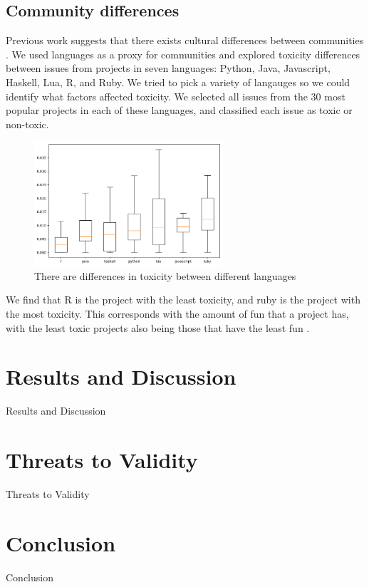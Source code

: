 \documentclass[conference]{IEEEtran}
\begin{document}
\subsection{Community differences} 
Previous work suggests that there exists cultural differences between communities \cite{bogart2016break}. We used languages as a proxy for communities and explored toxicity differences between issues from projects in seven languages: Python, Java, Javascript, Haskell, Lua, R, and Ruby. We tried to pick a variety of langauges so we could identify what factors affected toxicity. We selected all issues from the 30 most popular projects in each of these languages, and classified each issue as toxic or non-toxic. 

\begin{figure}
	\includegraphics[width=7cm]{box_plot.png}
	\caption{There are differences in toxicity between different languages} 
\end{figure}

We find that R is the project with the least toxicity, and ruby is the project with the most toxicity. This corresponds with the amount of fun that a project has, with the least toxic projects also being those that have the least fun \cite{bogart2016break}. 

\section{Results and Discussion}
Results and Discussion

\section{Threats to Validity}
Threats to Validity


\section{Conclusion}
Conclusion




\end{document}
